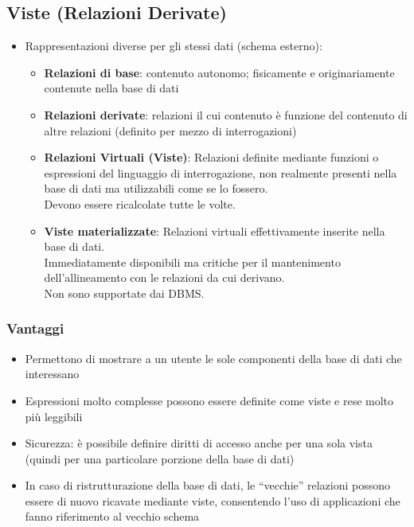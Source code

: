\documentclass[../main.tex]{subfiles}
\begin{document}
	\subsection{Viste (Relazioni Derivate)}
	\begin{itemize}
		\item Rappresentazioni diverse per gli stessi dati (schema esterno):
		\begin{itemize}
			\item \textbf{Relazioni di base}: contenuto autonomo; fisicamente e originariamente contenute nella base di dati
			\item \textbf{Relazioni derivate}: relazioni il cui contenuto è funzione del contenuto di altre relazioni (definito per mezzo di interrogazioni)
			\item \textbf{Relazioni Virtuali (Viste)}: Relazioni definite mediante funzioni o espressioni del linguaggio di interrogazione, non realmente presenti nella base di dati ma utilizzabili come se lo fossero. \\
			Devono essere ricalcolate tutte le volte.
			\item \textbf{Viste materializzate}: Relazioni virtuali effettivamente inserite nella base di dati.\\
			Immediatamente disponibili ma critiche per il mantenimento dell’allineamento con le relazioni da cui derivano.\\
			Non sono supportate dai DBMS.
		\end{itemize}
	\end{itemize}
	\subsubsection{Vantaggi}
	\begin{itemize}
		\item Permettono di mostrare a un utente le sole componenti della base di dati che interessano
		\item Espressioni molto complesse possono essere definite come viste e rese molto più leggibili
		\item Sicurezza: è possibile definire diritti di accesso anche per una sola vista (quindi per una particolare porzione della base di dati)
		\item In caso di ristrutturazione della base di dati, le “vecchie” relazioni possono essere di nuovo ricavate mediante viste, consentendo l’uso di applicazioni che fanno riferimento al vecchio schema
	\end{itemize}
\end{document}
